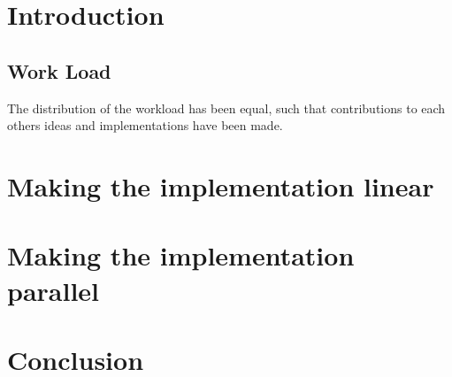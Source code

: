 \documentclass[a4paper,11pt,oneside]{book}
\begin{document}
\renewcommand{\contentsname}{Table of Contents}
\tableofcontents
\thispagestyle{empty}

\pagestyle{ruled}
\chapter{Introduction}
\setcounter{section}{1}

\section{Work Load}
The distribution of the workload has been equal, such that contributions to each others ideas and implementations have been made.

\chapter{Making the implementation linear}


\chapter{Making the implementation parallel}

\chapter{Conclusion}


\end{document}
